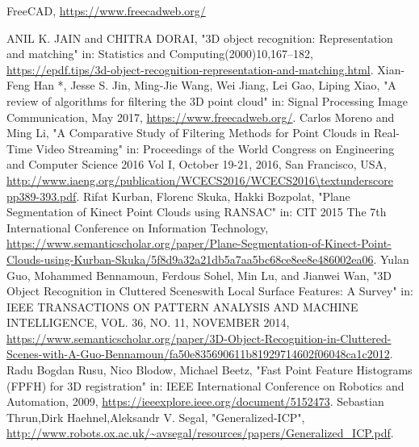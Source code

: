 \begin{thebibliography}{1}
		FreeCAD,
		\url{https://www.freecadweb.org/}

		ANIL K. JAIN and CHITRA DORAI,
		"3D object recognition: Representation and matching" in: Statistics and Computing(2000)10,167–182, \url{https://epdf.tips/3d-object-recognition-representation-and-matching.html}.
		Xian-Feng Han *, Jesse S. Jin, Ming-Jie Wang, Wei Jiang, Lei Gao, Liping Xiao,
		"A review of algorithms for filtering the 3D point cloud" in: Signal Processing Image Communication, May 2017, \url{https://www.freecadweb.org/}.
		Carlos Moreno and Ming Li,
		"A Comparative Study of Filtering Methods for Point Clouds in Real-Time Video Streaming" in: Proceedings of the World Congress on Engineering and Computer Science 2016 Vol I, October 19-21, 2016, San Francisco, USA, \url{http://www.iaeng.org/publication/WCECS2016/WCECS2016\textunderscore pp389-393.pdf}.
		Rifat Kurban, Florenc Skuka, Hakki Bozpolat,
		"Plane Segmentation of Kinect Point Clouds using RANSAC" in: CIT 2015 The 7th International Conference on Information Technology, \url{https://www.semanticscholar.org/paper/Plane-Segmentation-of-Kinect-Point-Clouds-using-Kurban-Skuka/5f8d9a32a21db5a7aa5bc68ce8ee8e486002ea06}.
		Yulan Guo, Mohammed Bennamoun, Ferdous Sohel, Min Lu, and Jianwei Wan,
		"3D Object Recognition in Cluttered Sceneswith Local Surface Features: A Survey" in: IEEE TRANSACTIONS ON PATTERN ANALYSIS AND MACHINE INTELLIGENCE,  VOL. 36,  NO. 11,  NOVEMBER 2014, \url{https://www.semanticscholar.org/paper/3D-Object-Recognition-in-Cluttered-Scenes-with-A-Guo-Bennamoun/fa50e835690611b81929714602f06048ca1c2012}.
		Radu Bogdan Rusu, Nico Blodow, Michael Beetz,
		"Fast Point Feature Histograms (FPFH) for 3D registration" in: IEEE International Conference on Robotics and Automation, 2009, \url{https://ieeexplore.ieee.org/document/5152473}.
		Sebastian Thrun,Dirk Haehnel,Aleksandr V. Segal,
		"Generalized-ICP", \url{http://www.robots.ox.ac.uk/~avsegal/resources/papers/Generalized_ICP.pdf}.	
\end{thebibliography}
